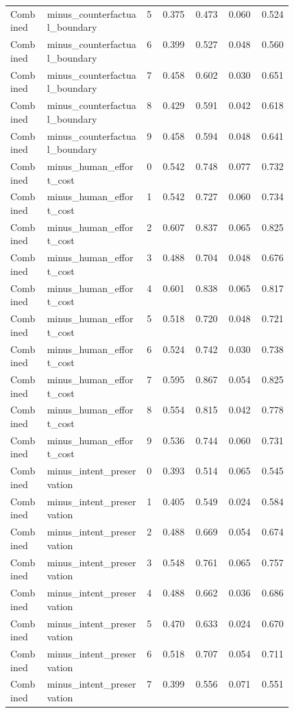 \documentclass{article}
\begin{document}
\begin{center}
\begin{longtable}{p{0.13\linewidth}p{0.35\linewidth}rrrrr}
Combined & minus\_counterfactual\_boundary & 5 & 0.375 & 0.473 & 0.060 & 0.524\\
Combined & minus\_counterfactual\_boundary & 6 & 0.399 & 0.527 & 0.048 & 0.560\\
Combined & minus\_counterfactual\_boundary & 7 & 0.458 & 0.602 & 0.030 & 0.651\\
Combined & minus\_counterfactual\_boundary & 8 & 0.429 & 0.591 & 0.042 & 0.618\\
Combined & minus\_counterfactual\_boundary & 9 & 0.458 & 0.594 & 0.048 & 0.641\\
Combined & minus\_human\_effort\_cost & 0 & 0.542 & 0.748 & 0.077 & 0.732\\
Combined & minus\_human\_effort\_cost & 1 & 0.542 & 0.727 & 0.060 & 0.734\\
Combined & minus\_human\_effort\_cost & 2 & 0.607 & 0.837 & 0.065 & 0.825\\
Combined & minus\_human\_effort\_cost & 3 & 0.488 & 0.704 & 0.048 & 0.676\\
Combined & minus\_human\_effort\_cost & 4 & 0.601 & 0.838 & 0.065 & 0.817\\
Combined & minus\_human\_effort\_cost & 5 & 0.518 & 0.720 & 0.048 & 0.721\\
Combined & minus\_human\_effort\_cost & 6 & 0.524 & 0.742 & 0.030 & 0.738\\
Combined & minus\_human\_effort\_cost & 7 & 0.595 & 0.867 & 0.054 & 0.825\\
Combined & minus\_human\_effort\_cost & 8 & 0.554 & 0.815 & 0.042 & 0.778\\
Combined & minus\_human\_effort\_cost & 9 & 0.536 & 0.744 & 0.060 & 0.731\\
Combined & minus\_intent\_preservation & 0 & 0.393 & 0.514 & 0.065 & 0.545\\
Combined & minus\_intent\_preservation & 1 & 0.405 & 0.549 & 0.024 & 0.584\\
Combined & minus\_intent\_preservation & 2 & 0.488 & 0.669 & 0.054 & 0.674\\
Combined & minus\_intent\_preservation & 3 & 0.548 & 0.761 & 0.065 & 0.757\\
Combined & minus\_intent\_preservation & 4 & 0.488 & 0.662 & 0.036 & 0.686\\
Combined & minus\_intent\_preservation & 5 & 0.470 & 0.633 & 0.024 & 0.670\\
Combined & minus\_intent\_preservation & 6 & 0.518 & 0.707 & 0.054 & 0.711\\
Combined & minus\_intent\_preservation & 7 & 0.399 & 0.556 & 0.071 & 0.551\\

\end{longtable}
\end{center}
\end{document}
